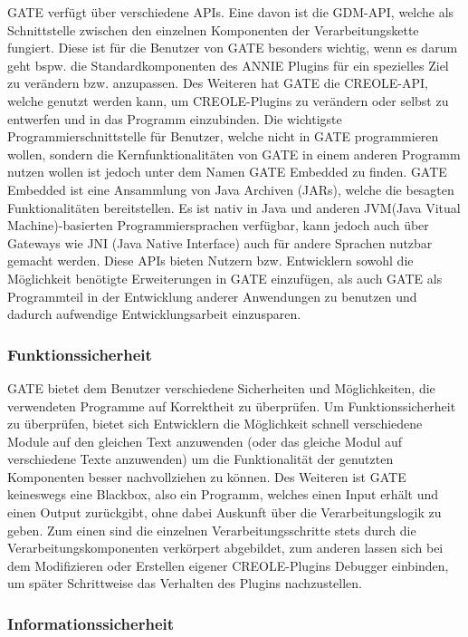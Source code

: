 \documentclass[12pt]{report}
\begin{document}
GATE verfügt über verschiedene APIs. Eine davon ist die GDM-API, welche als Schnittstelle zwischen den einzelnen Komponenten der Verarbeitungskette fungiert. Diese ist für die Benutzer von GATE besonders wichtig, wenn es darum geht bspw. die Standardkomponenten des ANNIE Plugins für ein spezielles Ziel zu verändern bzw. anzupassen. Des Weiteren hat GATE die CREOLE-API, welche genutzt werden kann, um CREOLE-Plugins zu verändern oder selbst zu entwerfen und in das Programm einzubinden.
Die wichtigste Programmierschnittstelle für Benutzer, welche nicht in GATE programmieren wollen, sondern die Kernfunktionalitäten von GATE in einem anderen Programm nutzen wollen ist jedoch unter dem Namen GATE Embedded zu finden. GATE Embedded ist eine Ansammlung von Java Archiven (JARs), welche die besagten Funktionalitäten bereitstellen. Es ist nativ in Java und anderen JVM(Java Vitual Machine)-basierten Programmiersprachen verfügbar, kann jedoch auch über Gateways wie JNI (Java Native Interface) auch für andere Sprachen nutzbar gemacht werden.
Diese APIs bieten Nutzern bzw. Entwicklern sowohl die Möglichkeit benötigte Erweiterungen in GATE einzufügen, als auch GATE als Programmteil in der Entwicklung anderer Anwendungen zu benutzen und dadurch aufwendige Entwicklungsarbeit einzusparen. 

\subsubsection{Funktionssicherheit}
GATE bietet dem Benutzer verschiedene Sicherheiten und Möglichkeiten, die verwendeten Programme auf Korrektheit zu überprüfen. 
Um Funktionssicherheit zu überprüfen, bietet sich Entwicklern die Möglichkeit schnell verschiedene Module auf den gleichen Text anzuwenden (oder das gleiche Modul auf verschiedene Texte anzuwenden) um die Funktionalität der genutzten Komponenten besser nachvollziehen zu können. Des Weiteren ist GATE keineswegs eine Blackbox, also ein Programm, welches einen Input erhält und einen Output zurückgibt, ohne dabei Auskunft über die Verarbeitungslogik zu geben. Zum einen sind die einzelnen Verarbeitungsschritte stets durch die Verarbeitungskomponenten verkörpert abgebildet, zum anderen lassen sich bei dem Modifizieren oder Erstellen eigener CREOLE-Plugins Debugger einbinden, um später Schrittweise das Verhalten des Plugins nachzustellen.

\subsubsection{Informationssicherheit}
\end{document}
